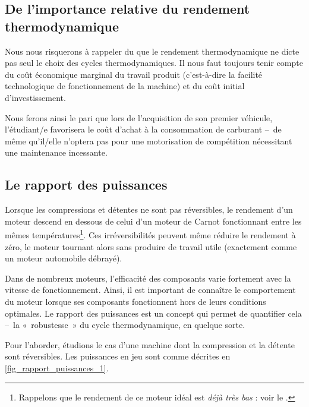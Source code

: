	\subsection[Importance relative du rendement]{De l’importance relative du rendement thermodynamique}

		Nous nous risquerons à rappeler du \coursneuf que le rendement thermodynamique ne dicte pas seul le choix des cycles thermodynamiques. Il nous faut toujours tenir compte du coût économique marginal du travail produit (c’est-à-dire la facilité technologique de fonctionnement de la machine) et du coût initial d’investissement.

		Nous ferons ainsi le pari que lors de l’acquisition de son premier véhicule, l’étu\-diant/e favorisera le coût d’achat à la consommation de carburant --\ de même qu’il/\-elle n’optera pas pour une motorisation de compétition nécessitant une maintenance incessante.



	\subsection{Le rapport des puissances}
	\label{ch_rapport_des_puissances}

		Lorsque les compressions et détentes ne sont pas réversibles, le rendement d’un moteur descend en dessous de celui d’un moteur de Carnot fonctionnant entre les mêmes températures\footnote{Rappelons que le rendement de ce moteur idéal est \textit{déjà très bas} : voir le \courssept.}. Ces irréversibilités peuvent même réduire le rendement à zéro, le moteur tournant alors sans produire de travail utile (exactement comme un moteur automobile débrayé).

		Dans de nombreux moteurs, l’efficacité des composants varie fortement avec la vitesse de fonctionnement. Ainsi, il est important de connaître le comportement du moteur lorsque ses composants fonctionnent hors de leurs conditions optimales. Le rapport des puissances est un concept qui permet de quantifier cela --\ la «~robustesse~» du cycle thermodynamique, en quelque sorte.

		Pour l’aborder, étudions le cas d’une machine dont la compression et la détente sont réversibles. Les puissances en jeu sont comme décrites en \cref{fig_rapport_puissances_1}.

